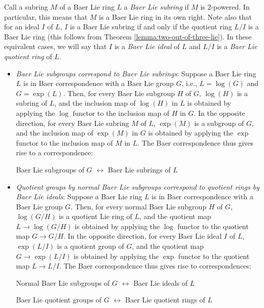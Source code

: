 \documentclass{ucetd}
\begin{document}
Call a subring $M$ of a Baer Lie ring $L$ a {\em Baer Lie subring} if
$M$ is $2$-powered. In particular, this means that $M$ is a Baer Lie
ring in its own right.  Note also that for an ideal $I$ of $L$, $I$ is
a Baer Lie subring if and only if the quotient ring $L/I$ is a Baer
Lie ring (this follows from Theorem
\ref{lemma:two-out-of-three-lie}). In these equivalent cases, we will
say that $I$ is a {\em Baer Lie ideal} of $L$ and $L/I$ is a {\em Baer
  Lie quotient ring} of $L$.

\begin{itemize}
\item {\em Baer Lie subgroups correspond to Baer Lie subrings}:
  Suppose a Baer Lie ring $L$ is in Baer correspondence with a Baer
  Lie group $G$, i.e., $L = \log(G)$ and $G = \exp(L)$. Then, for
  every Baer Lie subgroup $H$ of $G$, $\log(H)$ is a subring of $L$,
  and the inclusion map of $\log(H)$ in $L$ is obtained by applying
  the $\log$ functor to the inclusion map of $H$ in $G$. In the
  opposite direction, for every Baer Lie subring $M$ of $L$, $\exp(M)$
  is a subgroup of $G$, and the inclusion map of $\exp(M)$ in $G$ is
  obtained by applying the $\exp$ functor to the inclusion map of $M$
  in $L$. The Baer correspondence thus gives rise to a correspondence:

  \begin{center}
    Baer Lie subgroups of $G$ $\leftrightarrow$ Baer Lie subrings of $L$
  \end{center}

\item {\em Quotient groups by normal Baer Lie subgroups correspond to
  quotient rings by Baer Lie ideals}: Suppose a Baer Lie ring $L$ is
  in Baer correspondence with a Baer Lie group $G$. Then, for every
  normal Baer Lie subgroup $H$ of $G$, $\log(G/H)$ is a quotient Lie
  ring of $L$, and the quotient map $L \to \log(G/H)$ is obtained by
  applying the $\log$ functor to the quotient map $G \to G/H$. In the
  opposite direction, for every Baer Lie ideal $I$ of $L$, $\exp(L/I)$
  is a quotient group of $G$, and the quotient map $G \to \exp(L/I)$
  is obtained by applying the $\exp$ functor to the quotient map $L
  \to L/I$. The Baer correspondence thus gives rise to
  correspondences:

  \begin{center}
    Normal Baer Lie subgroups of $G$ $\leftrightarrow$ Baer Lie ideals of $L$
  \end{center}
  
  \begin{center}
    Baer Lie quotient groups of $G$ $\leftrightarrow$ Baer Lie
    quotient rings of $L$
  \end{center}


\end{itemize}
\end{document}
